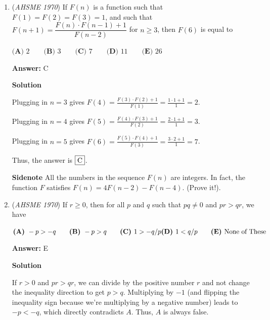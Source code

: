 \begin{enumerate}
 We now check which line has both $(3, 4)$ and one of the two trisection points on it.  Plugging in $(x, y) = (3, 4)$ into all five of the equations works.  The point $(2, 1)$ doesn't work in any of the five lines.  However, $(-1, 3)$ works in line $E$.  Thus, the answer is $\fbox{E}$



	\item (\textit{AHSME 1970}) If $F(n)$ is a function such that $F(1)=F(2)=F(3)=1$, and such that $F(n+1)=\dfrac{F(n)\cdot F(n-1)+1}{F(n-2)}$ for $n\ge 3$,
then $F(6)$ is equal to


 $\textbf{(A) }2\qquad \textbf{(B) }3\qquad \textbf{(C) }7\qquad \textbf{(D) }11\qquad  \textbf{(E) }26$

 \textbf{Answer: }C



\textbf{Solution}

Plugging in $n=3$ gives $F(4) = \frac{F(3) \cdot F(2) + 1}{F(1)} = \frac{1 \cdot 1 + 1}{1} = 2$.

 Plugging in $n=4$ gives $F(5) = \frac{F(4) \cdot F(3) + 1}{F(2)} = \frac{2 \cdot 1 + 1}{1} = 3$.

 Plugging in $n=5$ gives $F(6) = \frac{F(5) \cdot F(4) + 1}{F(3)} = \frac{3 \cdot 2 + 1}{1} = 7$.

 Thus, the answer is $\fbox{C}$.

 


 \textbf{Sidenote} All the numbers in the sequence $F(n)$ are integers. In fact, the function $F$ satisfies $F(n)=4F(n-2)-F(n-4)$. (Prove it!).

 


	\item (\textit{AHSME 1970}) If $r\ge 0$, then for all $p$ and $q$ such that $pq\neq 0$ and $pr>qr$, we have


 $\textbf{(A) }-p>-q\qquad \textbf{(B) }-p>q\qquad \textbf{(C) }1>-q/p\qquad\\ \textbf{(D) }1<q/p\qquad \textbf{(E) }\text{None of These}$

 \textbf{Answer: }E



\textbf{Solution}

If $r>0$ and $pr>qr$, we can divide by the positive number $r$ and not change the inequality direction to get $p>q$.  Multiplying by $-1$ (and flipping the inequality sign because we're multiplying by a negative number) leads to $-p < -q$, which directly contradicts $A$.  Thus, $A$ is always false.


\end{enumerate}
